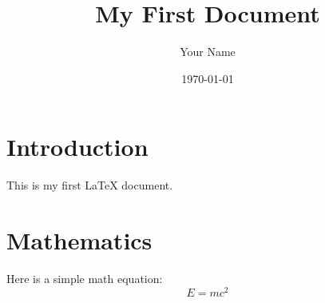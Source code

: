 \documentclass{article}
\title{My First Document}
\author{Your Name}
\date{\today}
\begin{document}
\maketitle

\section{Introduction}
This is my first LaTeX document. 

\section{Mathematics}
Here is a simple math equation:
$$
E = mc^2
$$
\end{document}
